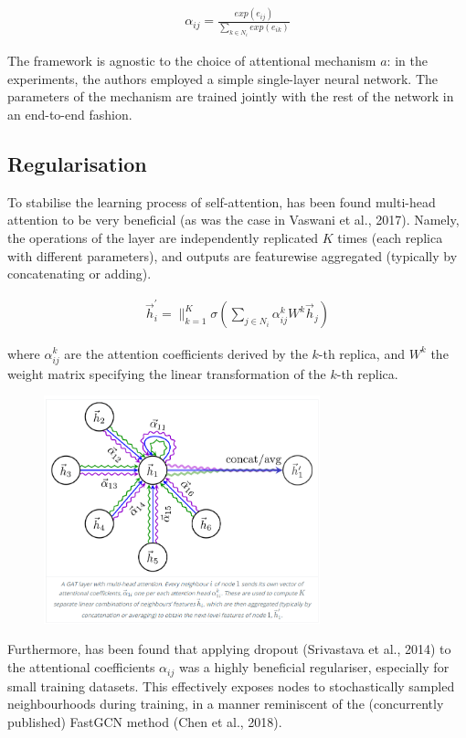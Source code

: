 \documentclass[12pt,a4paper]{article}
\begin{document}
\begin{align*}
\alpha_{ij} = \frac{exp(e_{ij})}{ \sum_{k \in N_{i} } exp(e_{ik})}
\end{align*}

The framework is agnostic to the choice of attentional mechanism $a$: in the experiments, the authors employed a simple single-layer neural network. The parameters of the mechanism are trained jointly with the rest of the network in an end-to-end fashion.

\subsection*{Regularisation}

To stabilise the learning process of self-attention, has been found multi-head attention to be very beneficial (as was the case in Vaswani et al., 2017). Namely, the operations of the layer are independently replicated $K$ times (each replica with different parameters), and outputs are featurewise aggregated (typically by concatenating or adding).

\begin{align*}
\overrightarrow{h}_{i}^{'} = \Bigg\|_{k=1}^{K} \sigma \left(  \sum_{j \in N_{i}} \alpha_{ij}^{k} W^{k}  \overrightarrow{h}_{j} \right) 
\end{align*}

where $\alpha_{ij}^{k}$ are the attention coefficients derived by the $k$-th replica, and $W^{k}$ the weight matrix specifying the linear transformation of the $k$-th replica.

\begin{figure}[h]
\includegraphics[width=8cm]{GAN-embeddings}
\centering
\end{figure}

Furthermore, has been found that applying dropout (Srivastava et al., 2014) to the attentional coefficients $\alpha_{ij}$ was a highly beneficial regulariser, especially for small training datasets. This effectively exposes nodes to stochastically sampled neighbourhoods during training, in a manner reminiscent of the (concurrently published) FastGCN method (Chen et al., 2018).
\end{document}
